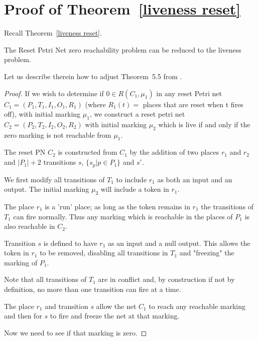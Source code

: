 \section{Proof of Theorem~\ref{liveness reset}}\label{appendix}

Recall Theorem~\ref{liveness reset}.


\begin{theorem*}
The  Reset Petri Net zero reachability problem can be reduced to the liveness problem.
\end{theorem*}

Let us describe therein how to adjust Theorem~5.5 from \cite{peterson1981petri}.

\begin{proof}
If we wish to determine if $0 \in R(C_1, \mu_1)$ in any
reset Petri net $C_1 = (P_1, T_1, I_1, O_1, R_1 )$ (where $R_1(t) =$ places that are reset when t fires off), with initial marking $\mu_1$, we construct a
reset petri net $C_2 = (P_2, T_2, I_2, O_2, R_2 )$ with initial marking
$\mu_2$ which is live if and only if the zero marking is not reachable from $\mu_1$.

The reset PN $C_2$ is constructed from $C_1$ by the addition of two places $r_1$ and $r_2$
and $|P_1| +2$ transitions $s$, $\{ s_p | p \in P_1 \}$ and $s'$.

We first modify all transitions of $T_1$ to include $r_1$ as both an input and an output.
The initial marking $\mu_2$ will include a token in $r_1$. 


The place $r_1$ is a 'run' place; as long as the token remains in $r_1$ the transitions of $T_1$ can fire normally.
Thus any marking which is reachable in the places of $P_1$ is also reachable in $C_2$.



Transition $s$ is defined to have $r_1$ as an input and a null output.
This allows the token in $r_1$ to be removed, disabling all transitions in $T_1$
and "freezing" the marking of $P_1$.

Note that all transitions of $T_1$ are in conflict and, by construction if not by definition, no more than one transition can fire at a time.

The place $r_1$ and transition $s$ allow the net $C_1$ to reach any reachable marking and then for $s$ to fire and freeze the net at that marking.

Now we need to see if that marking is zero.


\end{proof}

